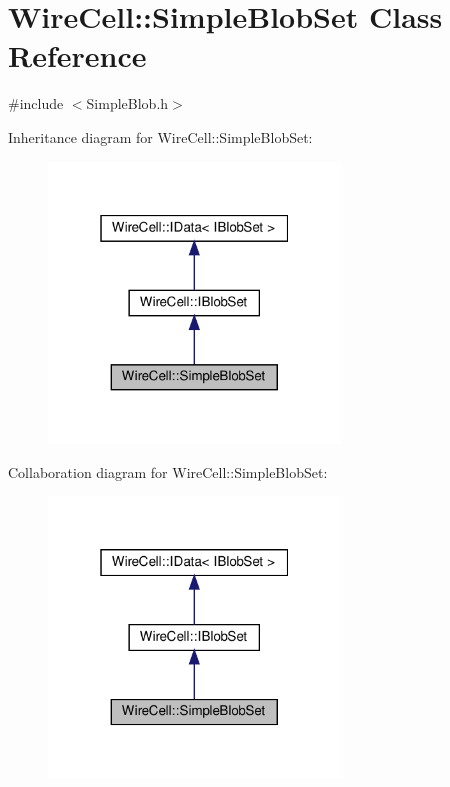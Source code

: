 \hypertarget{class_wire_cell_1_1_simple_blob_set}{}\section{Wire\+Cell\+:\+:Simple\+Blob\+Set Class Reference}
\label{class_wire_cell_1_1_simple_blob_set}


{\ttfamily \#include $<$Simple\+Blob.\+h$>$}



Inheritance diagram for Wire\+Cell\+:\+:Simple\+Blob\+Set\+:
\nopagebreak
\begin{figure}[H]
\begin{center}
\leavevmode
\includegraphics[width=220pt]{class_wire_cell_1_1_simple_blob_set__inherit__graph}
\end{center}
\end{figure}


Collaboration diagram for Wire\+Cell\+:\+:Simple\+Blob\+Set\+:
\nopagebreak
\begin{figure}[H]
\begin{center}
\leavevmode
\includegraphics[width=220pt]{class_wire_cell_1_1_simple_blob_set__coll__graph}
\end{center}
\end{figure}
